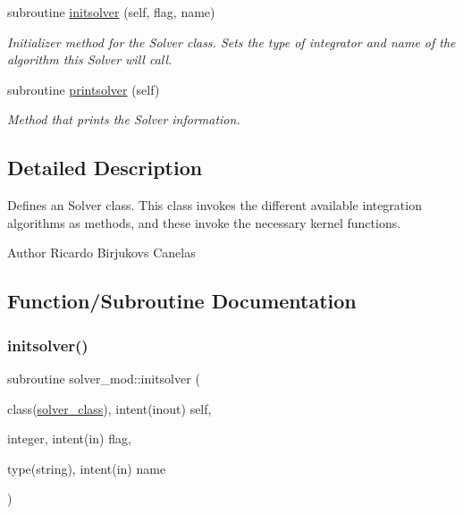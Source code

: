 \begin{DoxyCompactItemize}
subroutine \mbox{\hyperlink{namespacesolver__mod_a326292ff19880a914317109520b200b2}{initsolver}} (self, flag, name)
\begin{DoxyCompactList}\small\item\em Initializer method for the Solver class. Sets the type of integrator and name of the algorithm this Solver will call. \end{DoxyCompactList}\item 
subroutine \mbox{\hyperlink{namespacesolver__mod_a54ea6899cce026a7a5da2dd05922628f}{printsolver}} (self)
\begin{DoxyCompactList}\small\item\em Method that prints the Solver information. \end{DoxyCompactList}\end{DoxyCompactItemize}


\subsection{Detailed Description}
Defines an Solver class. This class invokes the different available integration algorithms as methods, and these invoke the necessary kernel functions. 

\begin{DoxyAuthor}{Author}
Ricardo Birjukovs Canelas 
\end{DoxyAuthor}


\subsection{Function/\+Subroutine Documentation}
\mbox{\label{namespacesolver__mod_a326292ff19880a914317109520b200b2}} 
\subsubsection{\texorpdfstring{initsolver()}{initsolver()}}
{\footnotesize\ttfamily subroutine solver\+\_\+mod\+::initsolver (\begin{DoxyParamCaption}\item[{class(\mbox{\hyperlink{structsolver__mod_1_1solver__class}{solver\+\_\+class}}), intent(inout)}]{self,  }\item[{integer, intent(in)}]{flag,  }\item[{type(string), intent(in)}]{name }\end{DoxyParamCaption})\hspace{0.3cm}{\ttfamily [private]}}



